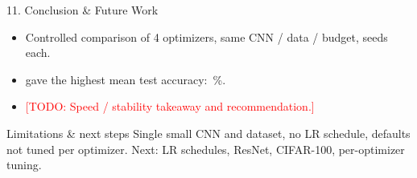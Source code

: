\documentclass[aspectratio=169,11pt]{beamer}
\newcommand{\todo}[1]{\textcolor{red}{[TODO: #1]}}
\begin{document}
\begin{frame}{11. Conclusion \& Future Work}
\begin{itemize}
  \item Controlled comparison of 4 optimizers, same CNN / data / budget, \nSeeds{} seeds each.
  \item \textbf{\bestOpt} gave the highest mean test accuracy: \bestAcc\,\%.
  \item \todo{Speed / stability takeaway and recommendation.}
\end{itemize}
\vspace{4pt}
\begin{block}{Limitations \& next steps}
Single small CNN and dataset, no LR schedule, defaults not tuned per optimizer. Next: LR schedules, ResNet, CIFAR-100, per-optimizer tuning.
\end{block}
\end{frame}
\end{document}
